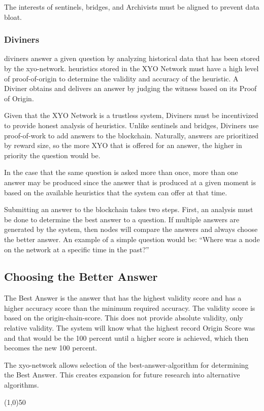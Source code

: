 \documentclass{article}
\begin{document}
The interests of \Glspl{sentinel}, \Glspl{bridge}, and Archivists must be aligned to prevent data bloat.

\subsubsection {Diviners}
\Glspl{diviner} answer a given question by analyzing historical data that has been stored by the \Gls{xyo-network}. \Glspl{heuristic} stored in the XYO Network must have a high level of \Gls{proof-of-origin} to determine the validity and \gls{accuracy} of the heuristic. A Diviner obtains and delivers an answer by judging the witness based on its Proof of Origin.

Given that the XYO Network is a trustless system, Diviners must be incentivized to provide honest analysis of heuristics. Unlike \Glspl{sentinel} and \Glspl{bridge}, Diviners use \Gls{proof-of-work} to add answers to the blockchain. Naturally, answers are prioritized by reward size, so the more XYO that is offered for an answer, the higher in priority the question would be.

In the case that the same question is asked more than once, more than one answer may be produced since the answer that is produced at a given moment is based on the available heuristics that the system can offer at that time.

Submitting an answer to the blockchain takes two steps. First, an analysis must be done to determine the best answer to a question. If multiple answers are generated by the system, then nodes will compare the answers and always choose the better answer. An example of a simple question would be: ``Where was a node on the network at a specific time in the past?''

\subsection {Choosing the Better Answer}
The Best Answer is the answer that has the highest validity score and has a higher \gls{accuracy} score than the minimum required accuracy. The validity score is based on the \Gls{origin-chain-score}. This does not provide absolute validity, only relative validity. The system will know what the highest record Origin Score was and that would be the 100 percent until a higher score is achieved, which then becomes the new 100 percent.

The \Gls{xyo-network} allows selection of the \Gls{best-answer-algorithm} for determining the Best Answer. This creates expansion for future research into alternative algorithms.
\begin{center}
\line(1,0){50}
\end{center}
\end{document}
